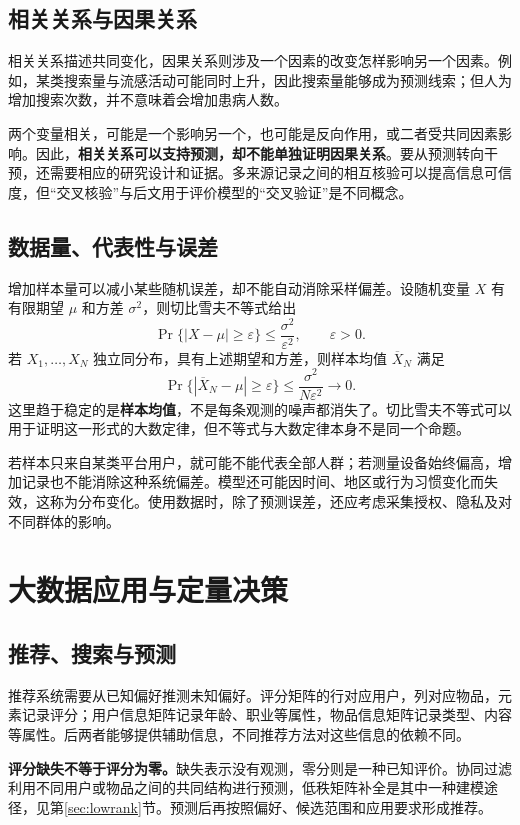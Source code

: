 \documentclass[UTF8,fontset=fandol,a4paper,12pt]{ctexart}
\theoremstyle{definition}
\begin{document}
\subsection{相关关系与因果关系}
相关关系描述共同变化，因果关系则涉及一个因素的改变怎样影响另一个因素。例如，某类搜索量与流感活动可能同时上升，因此搜索量能够成为预测线索；但人为增加搜索次数，并不意味着会增加患病人数。

两个变量相关，可能是一个影响另一个，也可能是反向作用，或二者受共同因素影响。因此，\textbf{相关关系可以支持预测，却不能单独证明因果关系}。要从预测转向干预，还需要相应的研究设计和证据。多来源记录之间的相互核验可以提高信息可信度，但“交叉核验”与后文用于评价模型的“交叉验证”是不同概念。

\subsection{数据量、代表性与误差}
增加样本量可以减小某些随机误差，却不能自动消除采样偏差。设随机变量 $X$ 有有限期望 $\mu$ 和方差 $\sigma^2$，则切比雪夫不等式给出
\[
 \Pr\{|X-\mu|\ge\varepsilon\}\le\frac{\sigma^2}{\varepsilon^2},
 \qquad\varepsilon>0.
\]
若 $X_1,\ldots,X_N$ 独立同分布，具有上述期望和方差，则样本均值 $\overline X_N$ 满足
\[
 \Pr\{|\overline X_N-\mu|\ge\varepsilon\}
 \le\frac{\sigma^2}{N\varepsilon^2}\longrightarrow0.
\]
这里趋于稳定的是\textbf{样本均值}，不是每条观测的噪声都消失了。切比雪夫不等式可以用于证明这一形式的大数定律，但不等式与大数定律本身不是同一个命题。

若样本只来自某类平台用户，就可能不能代表全部人群；若测量设备始终偏高，增加记录也不能消除这种系统偏差。模型还可能因时间、地区或行为习惯变化而失效，这称为分布变化。使用数据时，除了预测误差，还应考虑采集授权、隐私及对不同群体的影响。

\section{大数据应用与定量决策}
\subsection{推荐、搜索与预测}
推荐系统需要从已知偏好推测未知偏好。评分矩阵的行对应用户，列对应物品，元素记录评分；用户信息矩阵记录年龄、职业等属性，物品信息矩阵记录类型、内容等属性。后两者能够提供辅助信息，不同推荐方法对这些信息的依赖不同。

\textbf{评分缺失不等于评分为零。}缺失表示没有观测，零分则是一种已知评价。协同过滤利用不同用户或物品之间的共同结构进行预测，低秩矩阵补全是其中一种建模途径，见第\ref{sec:lowrank}节。预测后再按照偏好、候选范围和应用要求形成推荐。
\end{document}
